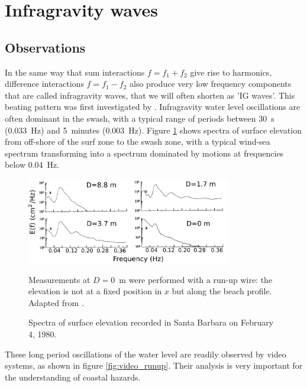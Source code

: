 \section{Infragravity waves}\label{sec:IG}
\subsection{Observations}
 In the same way that sum interactions $f=f_1 + f_2$  give rise to harmonics, difference interactions 
 $f=f_1 - f_2$ also produce very low frequency components that are called infragravity waves, that we will often shorten as 'IG waves'. 
 This beating pattern was first 
 investigated by \cite{Munk1949}. Infragravity water level oscillations are often dominant in the swash, with a typical range of periods
 between 30~s (0.033~Hz) and 5~minutes (0.003~Hz). Figure \ref{fig:NSTS_IG} shows spectra of surface elevation from off-shore of the surf zone 
 to the swash zone, with a typical wind-sea spectrum transforming into a spectrum dominated by motions at frequencies below 0.04~Hz.
\begin{figure}[htb]
\centerline{\includegraphics[width=0.8\textwidth]{FIGS_CH_SURF/Elgar_Guza_spectra_IG.pdf}}
  \caption{Spectra of surface elevation recorded in Santa Barbara on February 4, 1980.}
    {Measurements at $D=0$~m were performed with a run-up wire: the elevation is not at a fixed position in $x$ but along the beach profile. Adapted 
    from \cite{Elgar&Guza1985b}.}
\label{fig:NSTS_IG}
\end{figure}
These long period oscillations of the water level are readily observed by video systems, as shown in figure \ref{fig:video_runup}. Their analysis 
is very important for the understanding of coastal hazards. 
